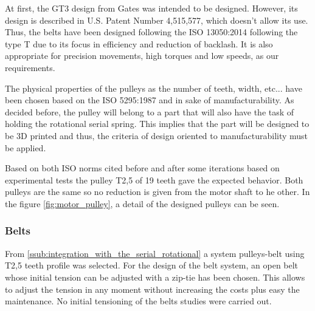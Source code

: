 At first, the GT3 design from Gates was intended to be designed.
However, its design is described in U.S. Patent Number 4,515,577, which doesn't allow its use.
Thus, the belts have been designed following the ISO 13050:2014 \cite{ISO13050} following the type T due to its focus in efficiency and reduction of backlash.
It is also appropriate for precision movements, high torques and low speeds, as our requirements.

The physical properties of the pulleys as the number of teeth, width, etc... have been chosen based on the ISO 5295:1987 \cite{ISO5295} and in sake of manufacturability.
As decided before, the pulley will belong to a part that will also have the task of holding the rotational serial spring.
This implies that the part will be designed to be 3D printed and thus, the criteria of design oriented to manufacturability must be applied.

Based on both ISO norms cited before and after some iterations based on experimental tests the pulley T2,5 of 19 teeth gave the expected behavior.
Both pulleys are the same so no reduction is given from the motor shaft to he other.
In the figure \ref{fig:motor_pulley}, a detail of the designed pulleys can be seen.

\subsubsection{Belts} %
\label{ssub:belts}
From \ref{ssub:integration_with_the_serial_rotational} a system pulleys-belt using T2,5 teeth profile was selected.
For the design of the belt system, an open belt whose initial tension can be adjusted with a zip-tie has been chosen.
This allows to adjust the tension in any moment without increasing the costs plus easy the maintenance.
No initial tensioning of the belts studies were carried out.

